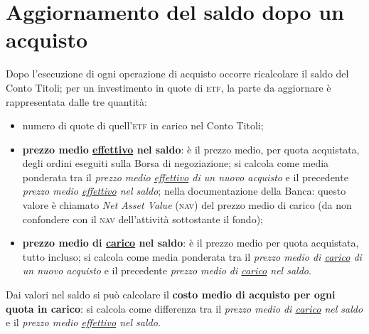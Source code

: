 \documentclass[12pt,a4paper]{article}
\newcommand{\Etf}[1]{\textsc{etf}}
\begin{document}
\section{Aggiornamento del saldo dopo un acquisto}




Dopo l'esecuzione di ogni operazione di acquisto  occorre ricalcolare il saldo del Conto Titoli; per
un investimento in quote di \Etf{}, la parte da aggiornare è rappresentata dalle tre quantità:
\begin{itemize}
\item numero di quote di quell'\Etf{} in carico nel Conto Titoli;
\item  \textbf{prezzo  medio  \underline{effettivo}  nel  saldo}:  è  il  prezzo  medio,  per  quota
  acquistata, degli ordini eseguiti sulla Borsa di negoziazione; si calcola come media ponderata tra
  il \emph{prezzo  medio \underline{effettivo} di  un nuovo  acquisto} e il  precedente \emph{prezzo
     medio  \underline{effettivo} nel  saldo}; nella  documentazione  della Banca:  questo valore  è
  chiamato \emph{Net Asset Value}  (\textsc{nav}) del prezzo medio di carico  (da non confondere con
  il \textsc{nav} dell'attività sottostante il fondo);
\item \textbf{prezzo medio di \underline{carico} nel saldo}: è il prezzo medio per quota acquistata,
  tutto incluso; si calcola come media ponderata  tra il \emph{prezzo medio di \underline{carico} di
     un nuovo acquisto} e il precedente \emph{prezzo medio di \underline{carico} nel saldo}.
\end{itemize}

Dai valori nel saldo si può calcolare il  \textbf{costo medio di acquisto per ogni quota in carico}:
si  calcola  come differenza  tra  il  \emph{prezzo medio  di  \underline{carico}  nel saldo}  e  il
\emph{prezzo medio \underline{effettivo} nel saldo}.
\end{document}
